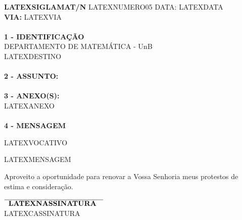 \documentclass[12pt]{artigo}
\begin{document}
\vspace*{.8cm}
\timbrado
\parindent=2cm 
\setlength{\baselineskip}{5mm}
\noindent 
\begin{minipage}{16cm}
\vspace*{-12mm}
\parindent=2cm
\setlength{\baselineskip}{5mm}
\vspace*{.2cm}
\noindent
\small
{\bf  LATEXSIGLA\/MAT/N\primo} LATEXNUMERO\/05 \hfill {DATA:} {LATEXDATA}
\vum \\
{\bf VIA:} {LATEXVIA}  
\\
\mbox{} \hrulefill
\\
{\bf 1 - IDENTIFICA\c{C}\~AO} 
\\
\phantom{xxx}{\bf Proced\^encia:} {DEPARTAMENTO DE MATEM\'ATICA - UnB}
\\
 {LATEXDESTINO}
\\
\mbox{} \hrulefill\
\\
{\bf 2 - ASSUNTO:} 
\phantom{xxx}{LATEXASSUNTO}
\\
\mbox{} \hrulefill
\\
{\bf 3 - ANEXO(S):} 
\\
\phantom{xxx} {LATEXANEXO}
\\
\mbox{} \hrulefill
\\
{ \bf 4 - MENSAGEM} 
\end{minipage}
\setlength{\baselineskip}{6mm}
\vspace*{2.5cm} 

LATEXVOCATIVO 
\vspace*{10mm} 

LATEXMENSAGEM
 
Aproveito a
oportunidade para renovar a Vossa Senhoria meus protestos de estima e considera\c{c}\~ao.
\vspace*{2.5cm} \\
\hspace*{5.5cm}
\setlength{\baselineskip}{4mm}
\begin{center}
$\overline{\phantom{x} \mbox{\bf  LATEXNASSINATURA }\phantom{x}}$
\\
LATEXCASSINATURA
\end{center}
\end{document}
